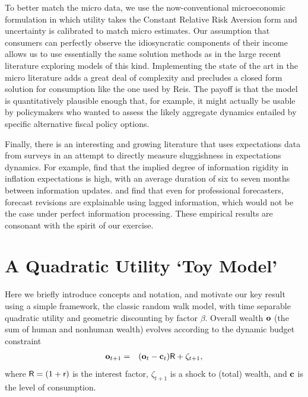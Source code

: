 \documentclass[titlepage]{./econtex}
\begin{document}
To better match the micro data, we use the now-conventional microeconomic formulation in which utility takes the Constant Relative Risk Aversion form and uncertainty is calibrated to match micro estimates.  Our assumption that consumers can perfectly observe the idiosyncratic components of their income allows us to use essentially the same solution methods as in the large recent literature exploring models of this kind.
Implementing the state of the art in the micro literature adds a great deal of complexity and precludes a closed form solution for consumption like the one used by Reis. The payoff is that the model is quantitatively plausible enough that, for example, it might actually be usable by policymakers who wanted to assess the likely aggregate dynamics entailed by specific alternative fiscal policy options.

Finally, there is an interesting and growing literature that uses expectations data from surveys in an attempt to directly measure sluggishness in expectations dynamics.
For example, \cite{coibGor:AER15} find that the implied degree of information rigidity in inflation expectations is high, with an average duration of six to seven months between information updates. \cite{fuhrer:JME17} and \cite{fuhrerIntrinsicPersistence} find that even for professional forecasters, forecast revisions are explainable using lagged information, which would not be the case under perfect information processing.  These empirical results are consonant with the spirit of our exercise.

\hypertarget{Quadratic}{}
\section{A Quadratic Utility `Toy Model'}\label{sec:Quadratic}

Here we briefly introduce concepts and notation, and motivate our key result using a simple framework, the classic \cite{hallRandomWalk} random walk model, with time separable quadratic utility and geometric discounting by factor $\beta$.  Overall wealth $\mathbf{o}$ (the sum of human and nonhuman wealth) evolves according to the dynamic budget constraint
\begin{eqnarray}
  \mathbf{o}_{t+1} & = & (\mathbf{o}_{t}-\mathbf{c}_{t})\mathsf{R}+\zeta_{t+1}, \label{eq:zAccum}
\end{eqnarray}
 where $\mathsf{R}=(1+\mathsf{r})$ is the interest factor, $\zeta_{t+1}$ is a shock to (total) wealth, and $\mathbf{c}$ is the level of consumption.
\end{document}
